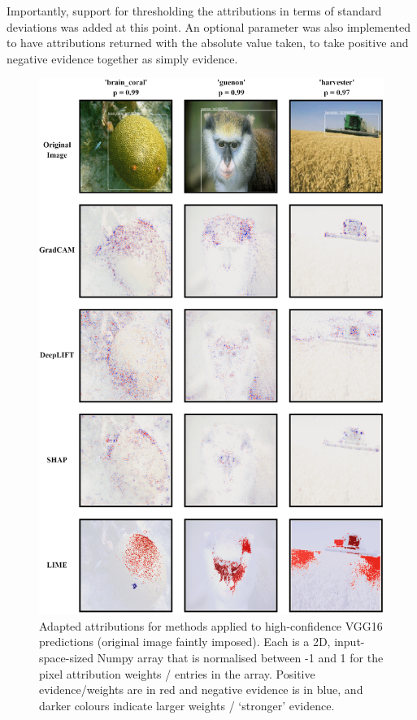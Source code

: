 \documentclass[main]{subfiles}
\begin{document}
Importantly, support for thresholding the attributions in terms of standard deviations was added at this point. An optional parameter was also implemented to have attributions returned with the absolute value taken, to take positive and negative evidence together as simply evidence.

\begin{figure}[htbp]
\centering
\includegraphics[scale=0.28]{method_box_adapted_1.png}
\caption{Adapted attributions for methods applied to high-confidence VGG16 predictions (original image faintly imposed). Each is a 2D, input-space-sized Numpy array that is normalised between -1 and 1 for the pixel attribution weights / entries in the array. Positive evidence/weights are in red and negative evidence is in blue, and darker colours indicate larger weights / `stronger' evidence.}
\label{panel2img}
\end{figure}
\end{document}
